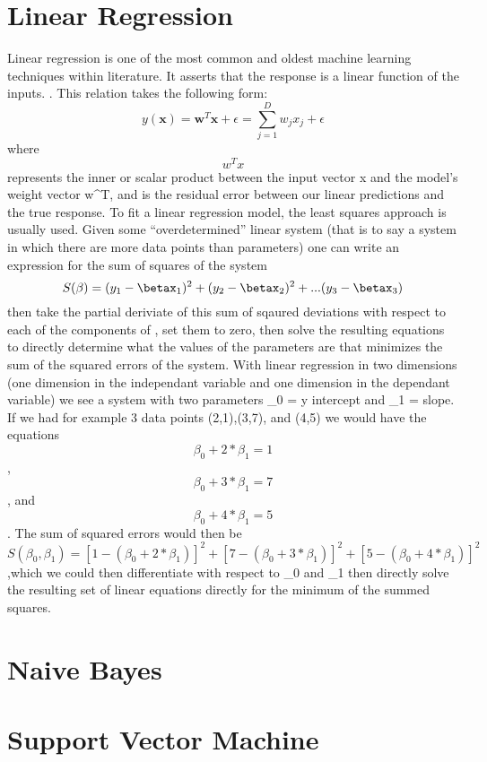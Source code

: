 \section{Linear Regression}
Linear regression is one of the most common and oldest machine learning techniques within
literature. It asserts that the response is a linear function of the inputs. \cite{murphy}.
This relation takes the following form:
$$ y(\textbf{x}) = \textbf{w}^T\textbf{x} + \epsilon = \sum_{j=1}^{D}w_jx_j + \epsilon $$
where $$w^Tx$$ represents the inner or scalar product between the input vector x and the
model's weight vector w^T, and \epsilon is the residual error between our linear predictions
and the true response.
To fit a linear regression model, the least squares approach is usually used. Given some
 ``overdetermined'' linear system (that is to say a system in which there are more data points
 than parameters) one can write an expression for the sum of squares of the system $$S(\beta) =
 (y_1 - \betax_1)^2 + (y_2 - \betax_2)^2 + ... (y_3 - \betax_3)$$ then take the partial deriviate
 of this sum of sqaured deviations with respect to each of the components of \beta, set them to
 zero, then solve the resulting equations to directly determine what the values of the parameters
 are that minimizes the sum of the squared errors of the system. With linear regression in two dimensions
 (one dimension in the independant variable and one dimension in the dependant variable) we see a system
 with two parameters \beta_0 = y intercept and \beta_1 = slope. If we had for example 3 data points
 (2,1),(3,7), and (4,5) we would have the equations $$\beta_0 + 2*\beta_1 = 1$$, $$\beta_0 + 3*\beta_1 = 7$$,
 and $$\beta_0 + 4*\beta_1 = 5$$. The sum of squared errors would then be
 $$S(\beta_0,\beta_1)= [1 - (\beta_0 + 2*\beta_1)]^2 + [7 - (\beta_0 + 3*\beta_1)]^2 + [5 - (\beta_0 + 4*\beta_1)]^2$$
 ,which we could then differentiate with respect to \beta_0 and \beta_1 then directly solve the resulting set
 of linear equations directly for the minimum of the summed squares.
\section{Naive Bayes}
\section{Support Vector Machine}
